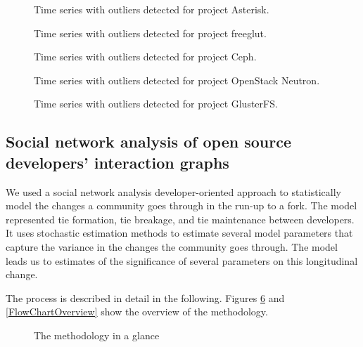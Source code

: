 \documentclass[12pt]{report}
\begin{document}
\begin{figure}
\centering
{}
\caption{Time series with outliers detected for project Asterisk.}
\label{figureOutliers_7}
\end{figure}

\begin{figure}
\centering
{}
\caption{Time series with outliers detected for project freeglut.}
\label{figureOutliers_9}
\end{figure}


\begin{figure}
\centering
{}
\caption{Time series with outliers detected for project Ceph.}
\label{figureOutliers_10}
\end{figure}

\begin{figure}
\centering
{}
\caption{Time series with outliers detected for project OpenStack Neutron.}
\label{figureOutliers_11}
\end{figure}

\begin{figure}
\centering
{}
\caption{Time series with outliers detected for project GlusterFS.}
\label{figureOutliers_12}
\end{figure}


\pagebreak

\subsection{Social network analysis of open source developers’ interaction graphs}

We used a social network analysis developer-oriented approach to statistically model the changes a community goes through in the run-up to a fork. The model represented tie formation, tie breakage, and tie maintenance between developers. It uses stochastic estimation methods to estimate several model parameters that capture the variance in the changes the community goes through. The model leads us to estimates of the significance of several parameters on this longitudinal change.

The process is described in detail in the following. Figures \ref{FlowChart} and \ref{FlowChartOverview} show the overview of the methodology.

\begin{figure}[!ht]
\centering
{}
\caption{The methodology in a glance}
\label{FlowChart}
\end{figure}
\end{document}
